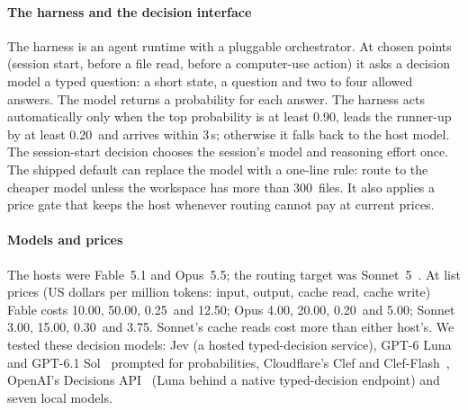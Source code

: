 \documentclass[11pt,letterpaper]{article}
\newcommand{\AoScopeFiles}{300}
\newcommand{\PriceFableIn}{10.00}
\newcommand{\PriceFableOut}{50.00}
\newcommand{\PriceFableRead}{0.25}
\newcommand{\PriceFableWrite}{12.50}
\newcommand{\PriceOpusIn}{4.00}
\newcommand{\PriceOpusOut}{20.00}
\newcommand{\PriceOpusRead}{0.20}
\newcommand{\PriceOpusWrite}{5.00}
\newcommand{\PriceSonnetIn}{3.00}
\newcommand{\PriceSonnetOut}{15.00}
\newcommand{\PriceSonnetRead}{0.30}
\newcommand{\PriceSonnetWrite}{3.75}
\newcommand{\MinMargin}{0.20}
\newcommand{\MinP}{0.90}
\newcommand{\TimeoutS}{3}
\begin{document}
\paragraph{The harness and the decision interface} The harness is an agent runtime with a pluggable orchestrator.
At chosen points (session start, before a file read, before a computer-use action) it asks a decision model a typed
question: a short state, a question and two to four allowed answers. The model returns a probability for each answer. The
harness acts automatically only when the top probability is at least \MinP, leads the runner-up by at least
\MinMargin\ and arrives within \TimeoutS\,s; otherwise it falls back to the host model. The session-start decision
chooses the session's model and reasoning effort once. The shipped default can replace the model with a one-line rule:
route to the cheaper model unless the workspace has more than \AoScopeFiles\ files. It also applies a price gate that
keeps the host whenever routing cannot pay at current prices.

\paragraph{Models and prices} The hosts were Fable~5.1 and Opus~5.5; the routing target was Sonnet~5~\cite{anthropicmodels}. At list prices
(US dollars per million tokens: input, output, cache read, cache write) Fable costs \PriceFableIn, \PriceFableOut,
\PriceFableRead\ and \PriceFableWrite; Opus \PriceOpusIn, \PriceOpusOut, \PriceOpusRead\ and \PriceOpusWrite; Sonnet
\PriceSonnetIn, \PriceSonnetOut, \PriceSonnetRead\ and \PriceSonnetWrite. Sonnet's cache reads cost more than either
host's. We tested these decision models: Jev (a hosted typed-decision service), GPT-6 Luna and GPT-6.1 Sol~\cite{oapricing} prompted for
probabilities, Cloudflare's Clef and Clef-Flash~\cite{clefcard,clefdocs}, OpenAI's Decisions API~\cite{oadecisions} (Luna behind a native typed-decision endpoint)
and seven local models.
\end{document}

